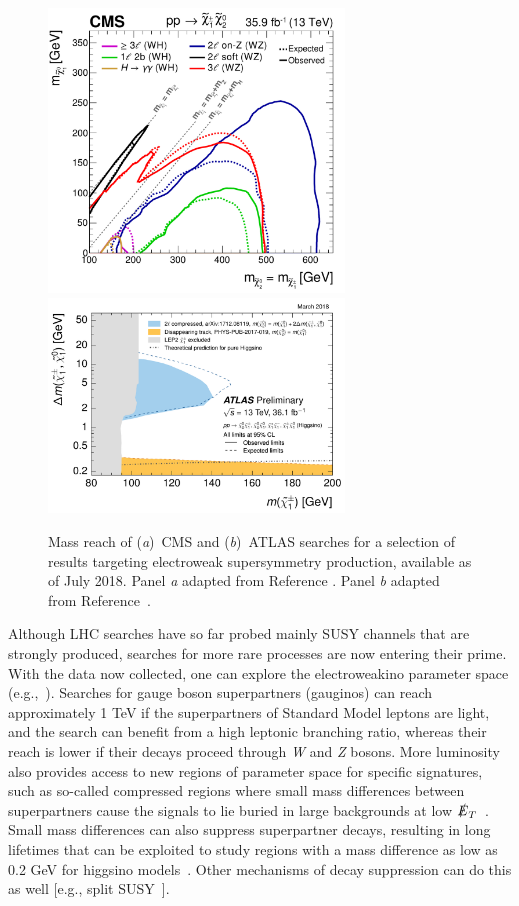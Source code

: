\documentclass{ar-1col}
\newcommand{\MET}{\ensuremath{\slashed{E}_T}\xspace}
\begin{document}
{\begin{figure}[!htpb]
\includegraphics[width=0.7\textwidth]{figures/CMS-SUS-17-004_Figure_010-a.pdf}
\includegraphics[width=0.7\textwidth]{figures/ATLAS_SUSY_EWSummary_higgsino.pdf}
\caption{Mass reach of (\textit{a})\ CMS and (\textit{b})\ ATLAS searches for a selection of
results targeting electroweak supersymmetry production, available as of
July 2018.
Panel \textit{a} adapted from Reference . 
Panel \textit{b} adapted from Reference~.\label{fig:SUSYSummary_ew}}
\end{figure}

Although LHC searches have so far probed mainly  SUSY channels that are strongly produced, searches for more rare processes are now entering their prime. With the data now collected, one can explore the
electroweakino parameter space (e.g.,~). Searches for gauge
boson superpartners (gauginos) can reach approximately 1 TeV if
the superpartners of Standard Model leptons are light, and the search can
benefit from a high leptonic branching ratio, whereas their reach
is lower if their decays proceed through \textit{W} and \textit{Z} bosons. More
luminosity also provides access to new regions of parameter space
for specific signatures, such as so-called compressed regions where small
mass differences between superpartners cause the signals to lie
buried in large backgrounds at low
\MET~\cite{Aaboud:2017leg,Sirunyan:2017zss}. Small mass
differences can also suppress superpartner decays, resulting in
long lifetimes that can be exploited to study regions with a mass
difference as low as 0.2 GeV for higgsino models~\cite{ATL-PHYS-PUB-2017-019}. Other mechanisms of decay
suppression can do this as well [e.g., split
SUSY~\cite{Sirunyan:2018vjp}].

}
\end{document}
